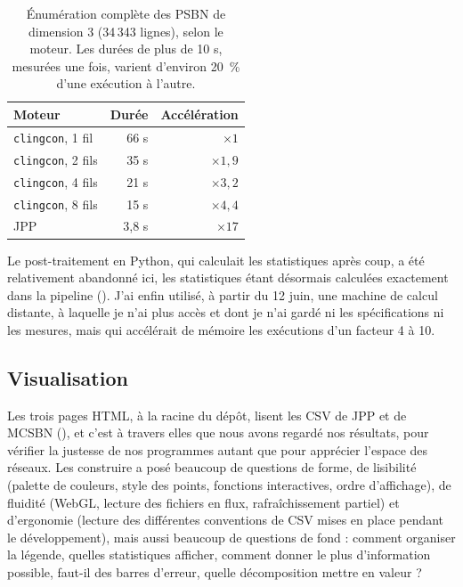 \documentclass[12pt, a4paper]{article}
\begin{document}
\begin{table}[H]
\centering
\small
\caption{Énumération complète des PSBN de dimension 3 (34\,343 lignes), selon le moteur. Les durées de plus de 10 s, mesurées une fois, varient d'environ 20~\% d'une exécution à l'autre.}
\label{tab:parallelisme}
\begin{tabular}{lrr}
\toprule
Moteur & Durée & Accélération \\
\midrule
\texttt{clingcon}, 1 fil & 66 s & $\times 1$ \\
\texttt{clingcon}, 2 fils & 35 s & $\times 1{,}9$ \\
\texttt{clingcon}, 4 fils & 21 s & $\times 3{,}2$ \\
\texttt{clingcon}, 8 fils & 15 s & $\times 4{,}4$ \\
JPP & 3,8 s & $\times 17$ \\
\bottomrule
\end{tabular}
\end{table}

Le post-traitement en Python, qui calculait les statistiques après coup, a été relativement abandonné ici, les statistiques étant désormais calculées exactement dans la pipeline ().
J'ai enfin utilisé, à partir du 12 juin, une machine de calcul distante, à laquelle je n'ai plus accès et dont je n'ai gardé ni les spécifications ni les mesures, mais qui accélérait de mémoire les exécutions d'un facteur 4 à 10.

\subsection{Visualisation}
\label{sec:observation}

Les trois pages HTML, à la racine du dépôt, lisent les CSV de JPP et de MCSBN (), et c'est à travers elles que nous avons regardé nos résultats, pour vérifier la justesse de nos programmes autant que pour apprécier l'espace des réseaux.
Les construire a posé beaucoup de questions de forme, de lisibilité (palette de couleurs, style des points, fonctions interactives, ordre d'affichage), de fluidité (WebGL, lecture des fichiers en flux, rafraîchissement partiel) et d'ergonomie (lecture des différentes conventions de CSV mises en place pendant le développement), mais aussi beaucoup de questions de fond : comment organiser la légende, quelles statistiques afficher, comment donner le plus d'information possible, faut-il des barres d'erreur, quelle décomposition mettre en valeur ?
\end{document}
